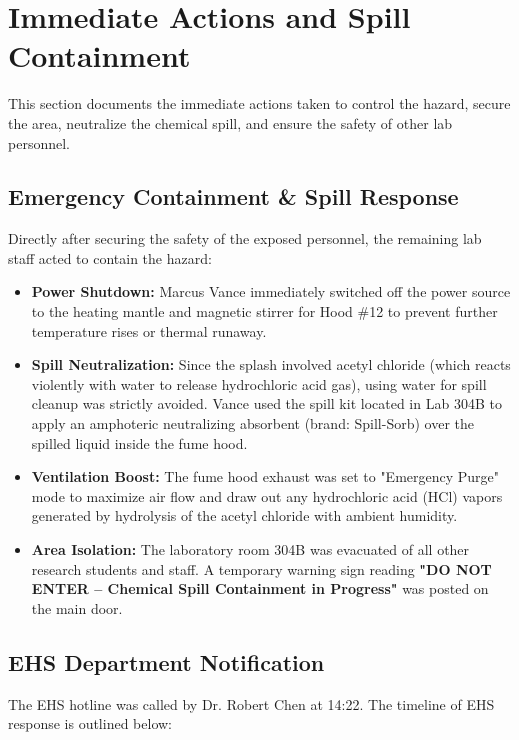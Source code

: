 \section{Immediate Actions and Spill Containment}
\thinrule

\vspace{0.5em}

This section documents the immediate actions taken to control the hazard, secure the area, neutralize the chemical spill, and ensure the safety of other lab personnel.

\subsection{Emergency Containment \& Spill Response}
Directly after securing the safety of the exposed personnel, the remaining lab staff acted to contain the hazard:

\begin{itemize}
    \item \textbf{Power Shutdown:} Marcus Vance immediately switched off the power source to the heating mantle and magnetic stirrer for Hood \#12 to prevent further temperature rises or thermal runaway.
    \item \textbf{Spill Neutralization:} Since the splash involved acetyl chloride (which reacts violently with water to release hydrochloric acid gas), using water for spill cleanup was strictly avoided. Vance used the spill kit located in Lab 304B to apply an amphoteric neutralizing absorbent (brand: Spill-Sorb) over the spilled liquid inside the fume hood.
    \item \textbf{Ventilation Boost:} The fume hood exhaust was set to "Emergency Purge" mode to maximize air flow and draw out any hydrochloric acid (HCl) vapors generated by hydrolysis of the acetyl chloride with ambient humidity.
    \item \textbf{Area Isolation:} The laboratory room 304B was evacuated of all other research students and staff. A temporary warning sign reading \textbf{"DO NOT ENTER -- Chemical Spill Containment in Progress"} was posted on the main door.
\end{itemize}

\subsection{EHS Department Notification}
The EHS hotline was called by Dr. Robert Chen at 14:22. The timeline of EHS response is outlined below:

